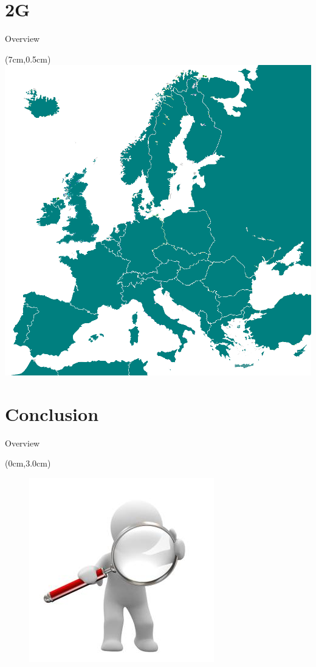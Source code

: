 \documentclass[10pt]{beamer}
\begin{document}
\section{2G}
\begin{frame}{Overview}
  \textblockorigin{0.0cm}{2.0cm}
  \tableofcontents[currentsection]
  
  \begin{textblock*}{6cm}(7cm,0.5cm)
   \includegraphics[width=1\columnwidth]{./pictures/2GNetworkStandards.png}
  \end{textblock*}
\end{frame}



\section{Conclusion}
\begin{frame}{Overview}
  \textblockorigin{0.0cm}{2.0cm}
  \tableofcontents[currentsection]
  
  \begin{textblock*}{12.5cm}(0cm,3.0cm)
    \begin{figure}[b!]
    \begin{flushright}
      \includegraphics[width=0.25\columnwidth]{./pictures/Evaluation.jpg}
    \end{flushright}  
  \end{figure}
  \end{textblock*}
\end{frame}
\end{document}
